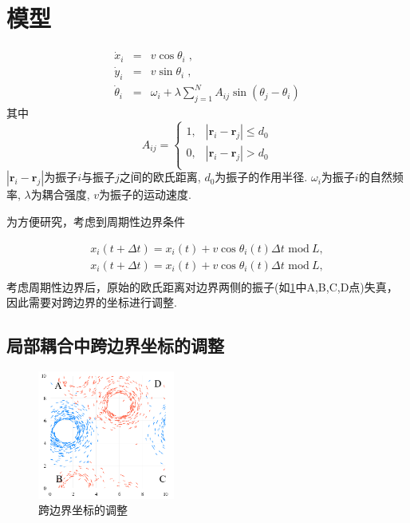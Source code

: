 \documentclass{article}
\begin{document}
\section{模型}

\begin{eqnarray}
    \dot{x}_i&=&v\cos \theta _i\;,\label{eq:dotxi}
  \\
    \dot{y}_i&=&v\sin \theta _i\;,\label{eq:dotyi}
  \\
    \dot{\theta}_i&=&\omega _i+\lambda \sum_{j=1}^N{A_{ij}\sin \left( \theta _j-\theta _i \right)}
    \label{eq:dotthetai}
\end{eqnarray}
其中
\begin{equation}
    A_{ij}=\begin{cases}
        1,&		\left| \mathbf{r}_i-\mathbf{r}_j \right|\le d_0\\
        0,&		\left| \mathbf{r}_i-\mathbf{r}_j \right|>d_0\\
    \end{cases}
\end{equation}
$\left| \mathbf{r}_i-\mathbf{r}_j \right|$为振子$i$与振子$j$之间的欧氏距离, $d_0$为振子的作用半径. $\omega _i$为振子$i$的自然频率, $\lambda$为耦合强度, $v$为振子的运动速度.

为方便研究，考虑到周期性边界条件

\begin{equation}
    \begin{array}{c}
        x_i\left( t+\Delta t \right) =x_i\left( t \right) +v\cos \theta _i\left( t \right) \Delta t\,\,\mathrm{mod}\ L,\\
        x_i\left( t+\Delta t \right) =x_i\left( t \right) +v\cos \theta _i\left( t \right) \Delta t\,\,\mathrm{mod}\ L,\\
    \end{array}
\end{equation}
考虑周期性边界后，原始的欧氏距离对边界两侧的振子(如\ref{fig:fig1}中A,B,C,D点)失真，因此需要对跨边界的坐标进行调整. 

\subsection{局部耦合中跨边界坐标的调整}\label{positionAdj}

\begin{figure}[htbp]
    \centering
    \includegraphics[width=0.4\textwidth]{./figs/fig1.jpg}
    \caption{跨边界坐标的调整}
    \label{fig:fig1}
\end{figure}
\end{document}
